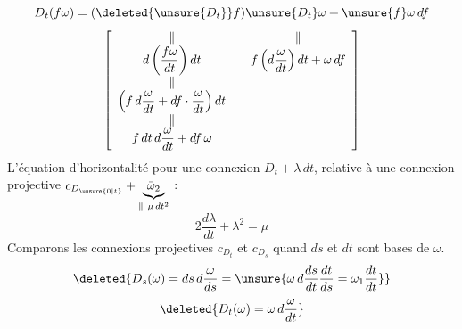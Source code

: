 \[
D_t(f\omega)=(\deleted{\unsure{D_t}}f)\unsure{D_t}\omega+\unsure{f}\omega\,df
\]
\[
\left[\begin{array}{c@{\qquad}c}
\Vert&\Vert\\
d\left(\dfrac{f\omega}{dt}\right)dt&f\left(d\dfrac\omega{dt}\right)dt+\omega\,df\\
\Vert&\\
\left(f\,d\dfrac\omega{dt}+df\cdot\dfrac\omega{dt}\right)dt&\\
\Vert&\\
f\,dt\,d\dfrac\omega{dt}+df\,\omega&
\end{array}\right]
\]
L'équation d'horizontalité pour une  connexion $D_t+\lambda\,dt$\deleted{$\unsure{\omega}$}, relative à une connexion projective  $c_{D_{\unsure{0|t}}}+\underbrace{\bar\omega_2}_{\Vert\ \mu\,dt^2}$ :
\[
\boxed{2\frac{d\lambda}{dt}+\lambda^2=\mu}
\]
Comparons les connexions projectives $c_{D_t}$ et $c_{D_s}$ quand $ds$ et $dt$ sont bases de $\omega$.
\[
\deleted{D_s(\omega)=ds\,d\frac\omega{ds}=\unsure{\omega\,d\frac{ds}{dt}\frac{dt}{ds}=\omega_1\frac{dt}{dt}}}
\]
\[
\deleted{D_t(\omega)=\omega\,d\frac\omega{dt}}
\]
